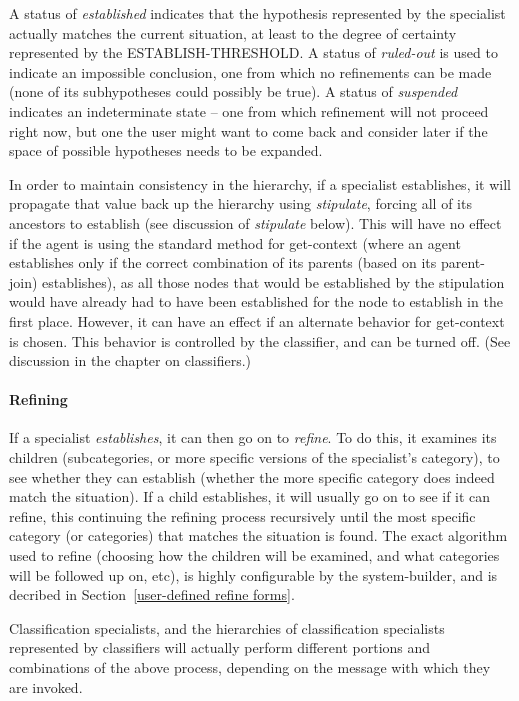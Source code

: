 A status of {\it established} indicates that the hypothesis
represented by the specialist actually matches the current situation,
at least to the degree of certainty represented by the
ESTABLISH-THRESHOLD. A status of {\it ruled-out} is used to indicate
an impossible conclusion, one from which no refinements can be made
(none of its subhypotheses could possibly be true). A status of {\it
suspended} indicates an indeterminate state -- one from which
refinement will not proceed right now, but one the user might want to
come back and consider later if the space of possible hypotheses needs
to be expanded.

In order to maintain consistency in the hierarchy, if a specialist
establishes, it will propagate that value back up the hierarchy using
{\it stipulate\/}, forcing all of its ancestors to establish (see
discussion of {\it stipulate} below). This will have no effect if the
agent is using the standard method for get-context (where an agent
establishes only if the correct combination of its parents (based on
its parent-join) establishes), as all those nodes that would be
established by the stipulation would have already had to have been
established for the node to establish in the first place. However, it
can have an effect if an alternate behavior for get-context is chosen.
This behavior is controlled by the classifier, and can be turned off.
(See discussion in the chapter on classifiers.)

\paragraph{Refining}

  If a specialist {\it establishes\/}, it can then go on to {\it
refine\/}.  To do this, it examines its children (subcategories, or
more specific versions of the specialist's category), to see whether
they can establish (whether the more specific category does indeed
match the situation). If a child establishes, it will usually go on to
see if it can refine, this continuing the refining process recursively
until the most specific category (or categories) that matches the
situation is found. The exact algorithm used to refine (choosing how
the children will be examined, and what categories will be followed up
on, etc), is highly configurable by the system-builder, and is
decribed in Section~\ref{user-defined refine forms}.

Classification specialists, and the hierarchies of classification
specialists represented by classifiers will actually perform different
portions and combinations of the above process, depending on the
message with which they are invoked.

